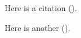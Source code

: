 Here is a citation (\cite[15]{Kavanaugh1976}).

\newpage
Here is another (\cite[32]{Saussure1995}).
